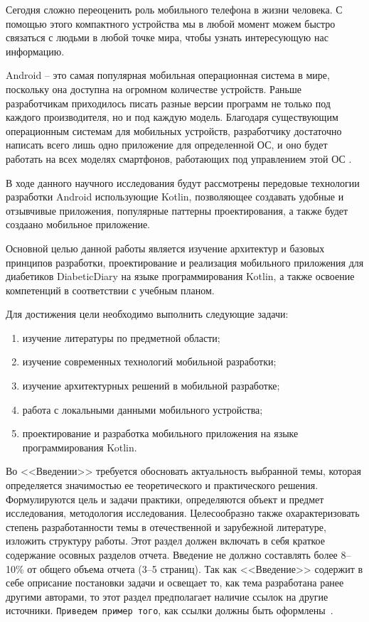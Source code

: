 \intro

Сегодня сложно переоценить роль мобильного телефона в жизни человека. С помощью этого компактного устройства мы в любой момент можем быстро связаться с людьми в любой точке мира, чтобы узнать интересующую нас информацию.

Android -- это самая популярная мобильная операционная система в мире, поскольку она доступна на огромном количестве устройств.
Раньше разработчикам приходилось писать разные версии программ не только под каждого производителя, но и под каждую модель. Благодаря существующим операционным системам для мобильных устройств, разработчику достаточно написать всего лишь одно приложение для определенной ОС, и оно будет работать на всех моделях смартфонов, работающих под управлением этой ОС \cite{book:1}.

В ходе данного научного исследования будут рассмотрены передовые технологии разработки Android использующие Kotlin, позволяющее создавать удобные и отзывчивые приложения, популярные паттерны проектирования, а также будет создаано мобильное приложение.

Основной целью данной работы является изучение архитектур и базовых принципов разработки, проектирование и реализация мобильного приложения для диабетиков DiabeticDiary на языке программирования Kotlin, а также освоение компетенций в соответствии с учебным планом.

Для достижения цели необходимо выполнить следующие задачи:
\begin{enumerate}
    \item изучение литературы по предметной области;
    \item изучение современных технологий мобильной разработки;
    \item изучение архитектурных решений в мобильной разработке;
    \item работа с локальными данными мобильного устройства;
    \item проектирование и разработка мобильного приложения на языке программирования Kotlin.
\end{enumerate}

Во <<Введении>>  требуется обосновать актуальность выбранной темы, которая
определяется значимостью ее теоретического и практического решения.
Формулируются цель и задачи практики, определяются объект и предмет
исследования, методология исследования. Целесообразно также охарактеризовать
степень разработанности темы в отечественной и зарубежной литературе,
изложить структуру работы. Этот раздел должен включать в себя краткое
содержание осовных разделов отчета. Введение не должно составлять более 8--10\%
от общего объема отчета (3--5 страниц). Так как <<Введение>> содержит в себе
оприсание постановки задачи и освещает то, как тема разработана ранее другими
авторами, то этот раздел предполагает наличие ссылок на другие источники.
\texttt{Приведем пример того}, как ссылки должны быть
оформлены~\cite{CitekeyArticle, Boreskov2010}.

